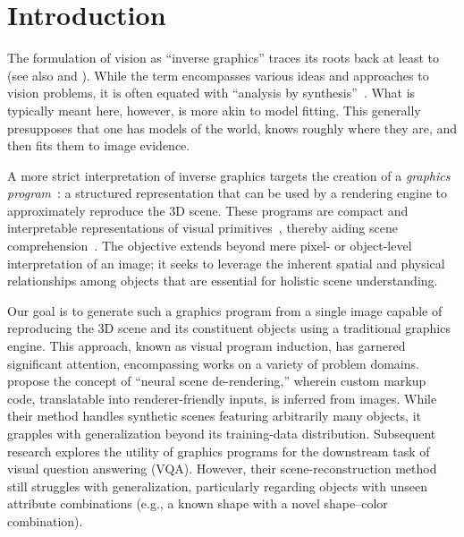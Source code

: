 \section{Introduction}\label{sec:introduction}
The formulation of vision as ``inverse graphics'' traces its roots back at least to \citet{baumgart1974geometric} (see also \citet{kersten1996introduction} and \citet{yuille2006vision}).
While the term encompasses various ideas and approaches to vision problems, it is often equated with ``analysis by synthesis''~\citep{grenander}.
What is typically meant here, however, is more akin to model fitting.
This generally presupposes that one has models of the world, knows roughly where they are, and then fits them to image evidence.



A more strict interpretation of inverse graphics targets the creation of a \emph{graphics program}~\citep{ritchie2023neurosymbolic}: a structured representation that can be used by a rendering engine to approximately reproduce the 3D scene.
These programs are compact and interpretable representations of visual primitives~\citep{wu2017neural,jones2023shapecoder}, thereby aiding scene comprehension~\citep{wu2017neural, yi2018neural}.
The objective extends beyond mere pixel- or object-level interpretation of an image; it seeks to leverage the inherent spatial and physical relationships among objects that are essential for holistic scene understanding.

Our goal is to generate such a graphics program from a single image capable of reproducing the 3D scene and its constituent objects using a traditional graphics engine.
This approach, known as visual program induction, has garnered significant attention, encompassing works on a variety of problem domains.
\citet{wu2017neural} propose the concept of ``neural scene de-rendering,'' wherein custom markup code, translatable into renderer-friendly inputs, is inferred from images.
While their method handles synthetic scenes featuring arbitrarily many objects, it grapples with generalization beyond its training-data distribution.
Subsequent research \citep{yi2018neural} explores the utility of graphics programs for the downstream task of visual question answering (VQA).
However, their scene-reconstruction method still struggles with generalization, particularly regarding objects with unseen attribute combinations (e.g., a known shape with a novel shape--color combination). 

